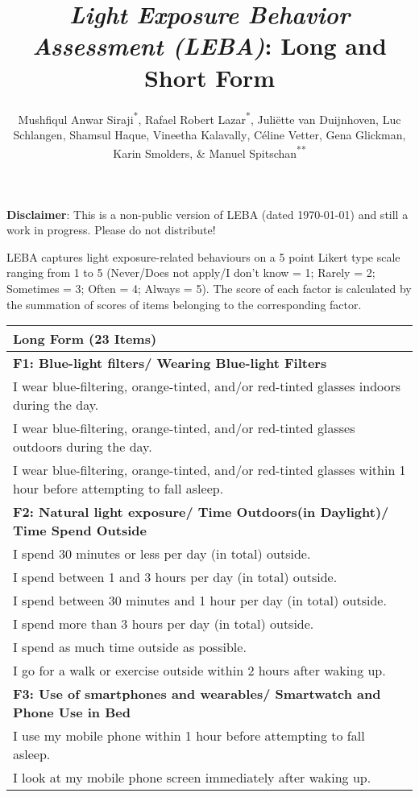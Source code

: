 \documentclass[
  english,
  man,floatsintext]{apa6}
\title{\emph{Light Exposure Behavior Assessment (LEBA)}: Long and Short Form}
\author{Mushfiqul Anwar Siraji\textsuperscript{*}, Rafael Robert Lazar\textsuperscript{*}, Juliëtte van Duijnhoven\textsuperscript{}, Luc Schlangen\textsuperscript{}, Shamsul Haque\textsuperscript{}, Vineetha Kalavally\textsuperscript{}, Céline Vetter\textsuperscript{}, Gena Glickman\textsuperscript{}, Karin Smolders\textsuperscript{}, \& Manuel Spitschan\textsuperscript{**}}
\date{}
\affiliation{\vspace{0.5cm}\textsuperscript{*} Joint first authors\\\textsuperscript{**} Corresponding author: \href{mailto:manuel.spitschan@psy.ox.ac.uk}{\nolinkurl{manuel.spitschan@psy.ox.ac.uk}}}
\begin{document}
\maketitle

\textbf{Disclaimer}: This is a non-public version of LEBA (dated \today) and still a work in progress. Please do not distribute!

LEBA captures light exposure-related behaviours on a 5 point Likert type scale ranging from 1 to 5 (Never/Does not apply/I don't know = 1; Rarely = 2; Sometimes = 3; Often = 4; Always = 5). The score of each factor is calculated by the summation of scores of items belonging to the corresponding factor.

\newpage

\begin{longtable}[]{@{}
  >{\raggedright\arraybackslash}p{}@{}}
\toprule
Long Form (23 Items) \\
\midrule
\endhead
\textbf{F1: Blue-light filters/ Wearing Blue-light Filters} \\
I wear blue-filtering, orange-tinted, and/or red-tinted glasses indoors during the day. \\
I wear blue-filtering, orange-tinted, and/or red-tinted glasses outdoors during the day. \\
I wear blue-filtering, orange-tinted, and/or red-tinted glasses within 1 hour before attempting to fall asleep. \\
\textbf{F2: Natural light exposure/ Time Outdoors(in Daylight)/ Time Spend Outside} \\
I spend 30 minutes or less per day (in total) outside. \\
I spend between 1 and 3 hours per day (in total) outside. \\
I spend between 30 minutes and 1 hour per day (in total) outside. \\
I spend more than 3 hours per day (in total) outside. \\
I spend as much time outside as possible. \\
I go for a walk or exercise outside within 2 hours after waking up. \\
\textbf{F3: Use of smartphones and wearables/ Smartwatch and Phone Use in Bed} \\
I use my mobile phone within 1 hour before attempting to fall asleep. \\
I look at my mobile phone screen immediately after waking up. \\

\end{longtable}
\end{document}
